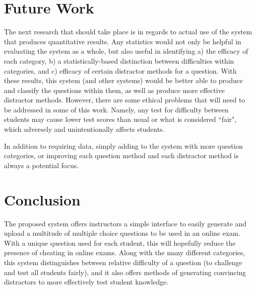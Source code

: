 \documentclass{article}
\begin{document}
\section{Future Work}

The next research that should take place is in regards to actual use of the system that produces quantitative results. Any statistics would not only be helpful in evaluating the system as a whole, but also useful in identifying a) the efficacy of each category, b) a statistically-based distinction between difficulties within categories, and c) efficacy of certain distractor methods for a question. With these results, this system (and other systems) would be better able to produce and classify the questions within them, as well as produce more effective distractor methods. However, there are some ethical problems that will need to be addressed in some of this work. Namely, any test for difficulty between students may cause lower test scores than usual or what is considered ``fair", which adversely and unintentionally affects students. 

In addition to requiring data, simply adding to the system with more question categories, or improving each question method and each distractor method is always a potential focus.

\section{Conclusion}

The proposed system offers instructors a simple interface to easily generate and upload a multitude of multiple choice questions to be used in an online exam. With a unique question used for each student, this will hopefully reduce the presence of cheating in online exams. Along with the many different categories, this system distinguishes between relative difficulty of a question (to challenge and test all students fairly), and it also offers methods of generating convincing distractors to more effectively test student knowledge. 
\end{document}
